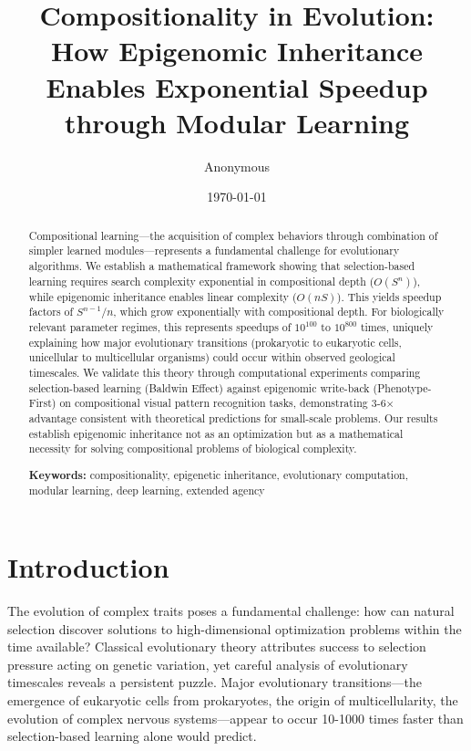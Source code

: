 \documentclass[11pt]{article}
\title{Compositionality in Evolution: How Epigenomic Inheritance Enables Exponential Speedup through Modular Learning}
\author{Anonymous}
\date{\today}
\theoremstyle{definition}
\begin{document}
\maketitle

\begin{abstract}

Compositional learning---the acquisition of complex behaviors through combination of simpler learned modules---represents a fundamental challenge for evolutionary algorithms. We establish a mathematical framework showing that selection-based learning requires search complexity exponential in compositional depth ($O(S^n)$), while epigenomic inheritance enables linear complexity ($O(nS)$). This yields speedup factors of $S^{n-1}/n$, which grow exponentially with compositional depth. For biologically relevant parameter regimes, this represents speedups of $10^{100}$ to $10^{800}$ times, uniquely explaining how major evolutionary transitions (prokaryotic to eukaryotic cells, unicellular to multicellular organisms) could occur within observed geological timescales. We validate this theory through computational experiments comparing selection-based learning (Baldwin Effect) against epigenomic write-back (Phenotype-First) on compositional visual pattern recognition tasks, demonstrating 3-6$\times$ advantage consistent with theoretical predictions for small-scale problems. Our results establish epigenomic inheritance not as an optimization but as a mathematical necessity for solving compositional problems of biological complexity.

\textbf{Keywords:} compositionality, epigenetic inheritance, evolutionary computation, modular learning, deep learning, extended agency

\end{abstract}

\section{Introduction}

The evolution of complex traits poses a fundamental challenge: how can natural selection discover solutions to high-dimensional optimization problems within the time available? Classical evolutionary theory attributes success to selection pressure acting on genetic variation, yet careful analysis of evolutionary timescales reveals a persistent puzzle. Major evolutionary transitions---the emergence of eukaryotic cells from prokaryotes, the origin of multicellularity, the evolution of complex nervous systems---appear to occur 10-1000 times faster than selection-based learning alone would predict.
\end{document}
